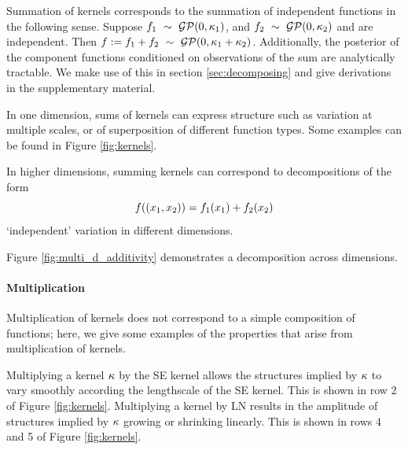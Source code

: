 \documentclass[twoside]{article}
\begin{document}
Summation of kernels corresponds to the summation of independent functions in the following sense.
Suppose ${f_1 \ \sim\  \mathcal{GP}(0, \kappa_1)}$, and ${f_2 \ \sim\  \mathcal{GP}(0, \kappa_2)}$ and are independent.
Then ${f := f_1 + f_2 \ \sim\  \mathcal{GP}(0, \kappa_1 + \kappa_2)}$.
Additionally, the posterior of the component functions conditioned on observations of the sum are analytically tractable. We make use of this in section \ref{sec:decomposing} and give derivations in the supplementary material.

In one dimension, sums of kernels can express structure such as variation at multiple scales, or of superposition of different function types.  Some examples can be found in Figure \ref{fig:kernels}.

In higher dimensions, summing kernels can correspond to decompositions of the form
\begin{equation}
f((x_1, x_2)) = f_1(x_1) + f_2(x_2)
\end{equation}
\ie `independent' variation in different dimensions.
%

%
Figure \ref{fig:multi_d_additivity} demonstrates a decomposition across dimensions.


\paragraph{Multiplication}

Multiplication of kernels does not correspond to a simple composition of functions; here, we give some examples of the properties that arise from multiplication of kernels.

%
%


Multiplying a kernel $\kappa$ by the SE kernel allows the structures implied by $\kappa$ to vary smoothly according the lengthscale of the SE kernel.  This is shown in row 2 of Figure \ref{fig:kernels}.
Multiplying a kernel by LN results in the amplitude of structures implied by $\kappa$ growing or shrinking linearly. This is shown in rows 4 and 5 of Figure \ref{fig:kernels}.
%
\end{document}
